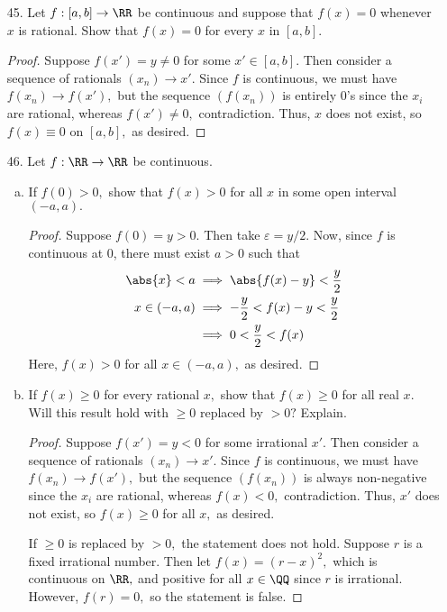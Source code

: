 \documentclass{article}
\begin{document}
\begin{itemize}
	\item[45.] Let $f:[a, b]\to\RR$ be continuous and suppose that $f(x)=0$ whenever $x$ is rational. Show that $f(x)=0$ for every $x$ in $[a, b].$
		\begin{proof}
			Suppose $f(x')=y\neq 0$ for some $x'\in[a, b].$ Then consider a sequence of rationals $(x_n)\to x'.$ Since $f$ is continuous, we must have $f(x_n)\to f(x'),$ but the sequence $(f(x_n))$ is entirely 0's since the $x_i$ are rational, whereas $f(x')\neq 0,$ contradiction. Thus, $x$ does not exist, so $f(x)\equiv0$ on $[a, b],$ as desired.
		\end{proof}

	\item[46.] Let $f:\RR\to\RR$ be continuous.
		\begin{enumerate}[(a)]
			\item If $f(0)>0,$ show that $f(x)>0$ for all $x$ in some open interval $(-a, a).$
				\begin{proof}
					Suppose $f(0)=y>0.$ Then take $\varepsilon=y/2.$ Now, since $f$ is continuous at 0, there must exist $a>0$ such that
					\begin{align*}
						\abs{x}<a &\implies \abs{f(x)-y}<\frac{y}{2} \\
						x\in(-a, a) &\implies -\frac{y}{2}<f(x)-y<\frac{y}{2} \\
						&\implies 0<\frac{y}{2} < f(x)
					\end{align*}
					Here, $f(x)>0$ for all $x\in(-a, a),$ as desired.
				\end{proof}

			\item If $f(x)\ge 0$ for every rational $x,$ show that $f(x)\ge0$ for all real $x.$ Will this result hold with $\ge0$ replaced by $>0?$ Explain.
				\begin{proof}
					Suppose $f(x')=y<0$ for some irrational $x'.$ Then consider a sequence of rationals $(x_n)\to x'.$ Since $f$ is continuous, we must have $f(x_n)\to f(x'),$ but the sequence $(f(x_n))$ is always non-negative since the $x_i$ are rational, whereas $f(x)<0,$ contradiction. Thus, $x'$ does not exist, so $f(x)\ge 0$ for all $x,$ as desired. 

					If $\ge 0$ is replaced by $>0,$ the statement does not hold. Suppose $r$ is a fixed irrational number. Then let $f(x)=(r-x)^2,$ which is continuous on $\RR,$ and positive for all $x\in\QQ$ since $r$ is irrational. However, $f(r)=0,$ so the statement is false.
				\end{proof}
				
		\end{enumerate}
		
\end{itemize}
\end{document}

